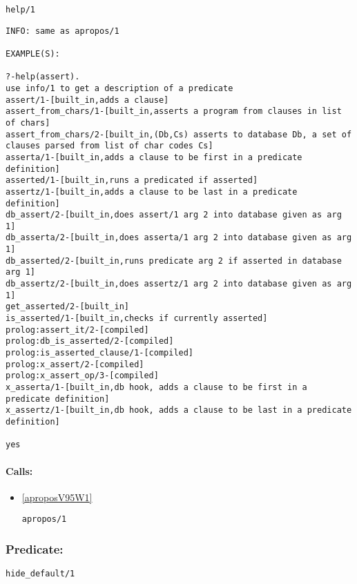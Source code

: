 \begin{verbatim}
help/1
\end{verbatim}

{\small \begin{verbatim}
INFO: same as apropos/1

EXAMPLE(S):

?-help(assert).
use info/1 to get a description of a predicate
assert/1-[built_in,adds a clause]
assert_from_chars/1-[built_in,asserts a program from clauses in list of chars]
assert_from_chars/2-[built_in,(Db,Cs) asserts to database Db, a set of clauses parsed from list of char codes Cs]
asserta/1-[built_in,adds a clause to be first in a predicate definition]
asserted/1-[built_in,runs a predicated if asserted]
assertz/1-[built_in,adds a clause to be last in a predicate definition]
db_assert/2-[built_in,does assert/1 arg 2 into database given as arg 1]
db_asserta/2-[built_in,does asserta/1 arg 2 into database given as arg 1]
db_asserted/2-[built_in,runs predicate arg 2 if asserted in database arg 1]
db_assertz/2-[built_in,does assertz/1 arg 2 into database given as arg 1]
get_asserted/2-[built_in]
is_asserted/1-[built_in,checks if currently asserted]
prolog:assert_it/2-[compiled]
prolog:db_is_asserted/2-[compiled]
prolog:is_asserted_clause/1-[compiled]
prolog:x_assert/2-[compiled]
prolog:x_assert_op/3-[compiled]
x_asserta/1-[built_in,db hook, adds a clause to be first in a predicate definition]
x_assertz/1-[built_in,db hook, adds a clause to be last in a predicate definition]

yes

\end{verbatim}}
\paragraph{Calls:} 
\begin{itemize}
\item \ref{aproposV95W1} 
\begin{verbatim}
apropos/1
\end{verbatim}

\end{itemize}

\subsubsection{Predicate:} \label{hideV95WdefaultV95W1}

\begin{verbatim}
hide_default/1
\end{verbatim}

